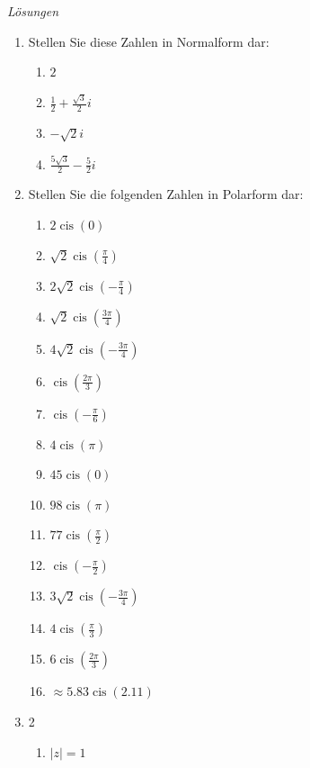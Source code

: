 \clearpage
\emph{Lösungen}
\begin{enumerate}
    \item Stellen Sie diese Zahlen in Normalform dar:
    \begin{enumerate}
        \item[(a)] $2$
        \item[(b)] $\frac{1}{2} + \frac{\sqrt{3}}{2}i$
        \item[(c)] $-\sqrt{2}i$
        \item[(d)] $\frac{5\sqrt{3}}{2} - \frac{5}{2}i$
    \end{enumerate}
    
    \item Stellen Sie die folgenden Zahlen in Polarform dar:
    \begin{enumerate}
        \item $2 \operatorname{cis}(0)$
        \item $\sqrt{2} \operatorname{cis}(\frac{\pi}{4})$
        \item $2\sqrt{2} \operatorname{cis}(-\frac{\pi}{4})$
        \item $\sqrt{2} \operatorname{cis}(\frac{3\pi}{4})$
        \item $4\sqrt{2} \operatorname{cis}(-\frac{3\pi}{4})$
        \item $ \operatorname{cis}(\frac{2\pi}{3})$
        \item $ \operatorname{cis}(-\frac{\pi}{6})$
        \item $4 \operatorname{cis}(\pi)$
        \item $45 \operatorname{cis}(0)$
        \item $98 \operatorname{cis}(\pi)$
        \item $77 \operatorname{cis}(\frac{\pi}{2})$
        \item $\operatorname{cis}(-\frac{\pi}{2})$
        \item $3\sqrt{2} \operatorname{cis}(-\frac{3\pi}{4})$
        \item $4 \operatorname{cis}(\frac{\pi}{3})$
        \item $6 \operatorname{cis}(\frac{2\pi}{3})$
        \item $\approx 5.83 \operatorname{cis}(2.11)$
    \end{enumerate}
    
    \item  \begin{multicols}{2}
        \begin{enumerate}
            \item $|z| = 1$
            \begin{center}
        

\end{center}
\end{enumerate}
\end{multicols}
\end{enumerate}
